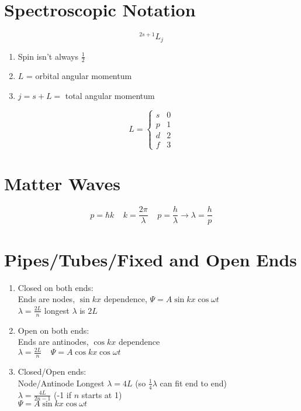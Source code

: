 \documentclass[10pt,a4paper]{article}
\begin{document}
\section{Spectroscopic Notation} %
\label{sec:spectroscopic_notation}
\begin{equation}
    ^{2s+1}L_j
\end{equation}
\begin{enumerate}
    \item Spin isn't always $\frac{1}{2}$    
    \item $L$ = orbital angular momentum
    \item $j= s+ L = $ total angular momentum
\end{enumerate}
\[
  L= \begin{cases}
    s & 0\\
    p & 1\\
    d & 2\\
    f & 3
  \end{cases}
\]

\section{Matter Waves} %
\label{sec:matter_waves}
\begin{equation}
    p = \hbar k ~~~~~ k = \frac{2 \pi }{\lambda} ~~~~~ p = \frac{h}{\lambda} \rightarrow \lambda = \frac{h}{p}
\end{equation}

\section{Pipes/Tubes/Fixed and Open Ends} %
\label{sec:pipes_tubes_fixed_and_open_ends}
\begin{enumerate}
    \item Closed on both ends:\\
    Ends are nodes, $\sin kx $ dependence, $\Psi = A \sin kx \cos \omega t$\\
    $\lambda = \frac{2L}{n}$  longest $\lambda$ is $2L$
    \item Open on both ends:\\
    Ends are antinodes, $\cos kx$ dependence\\
    $\lambda = \frac{2L}{n} ~~~~~ \Psi = A \cos kx \cos \omega t$
    \item Closed/Open ends:\\
    Node/Antinode   Longest $\lambda = 4L$ (so $\frac{1}{4}\lambda$ can fit end to end)\\
    $\lambda = \frac{4L}{2n-1}$ (-1 if $n$ starts at 1)\\
    $\Psi = A \sin kx \cos \omega t$
\end{enumerate}
\end{document}
